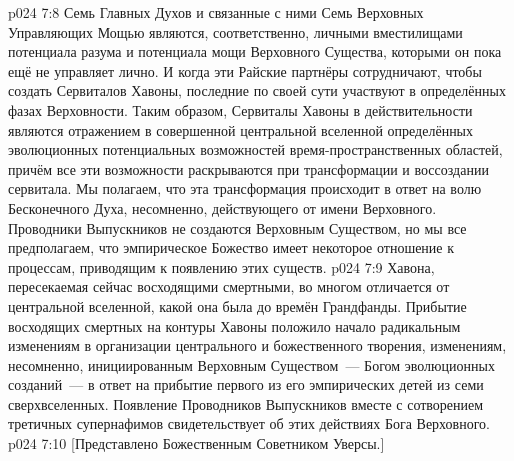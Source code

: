 \vs p024 7:8 \pc Семь Главных Духов и связанные с ними Семь Верховных Управляющих Мощью являются, соответственно, личными вместилищами потенциала разума и потенциала мощи Верховного Существа, которыми он пока ещё не управляет лично. И когда эти Райские партнёры сотрудничают, чтобы создать Сервиталов Хавоны, последние по своей сути участвуют в определённых фазах Верховности. Таким образом, Сервиталы Хавоны в действительности являются отражением в совершенной центральной вселенной определённых эволюционных потенциальных возможностей время\hyp{}пространственных областей, причём все эти возможности раскрываются при трансформации и воссоздании сервитала. Мы полагаем, что эта трансформация происходит в ответ на волю Бесконечного Духа, несомненно, действующего от имени Верховного. Проводники Выпускников не создаются Верховным Существом, но мы все предполагаем, что эмпирическое Божество имеет некоторое отношение к процессам, приводящим к появлению этих существ.
\vs p024 7:9 Хавона, пересекаемая сейчас восходящими смертными, во многом отличается от центральной вселенной, какой она была до времён Грандфанды. Прибытие восходящих смертных на контуры Хавоны положило начало радикальным изменениям в организации центрального и божественного творения, изменениям, несомненно, инициированным Верховным Существом~--- Богом эволюционных созданий~--- в ответ на прибытие первого из его эмпирических детей из семи сверхвселенных. Появление Проводников Выпускников вместе с сотворением третичных супернафимов свидетельствует об этих действиях Бога Верховного.
\vsetoff
\vs p024 7:10 [Представлено Божественным Советником Уверсы.]
\quizlink
